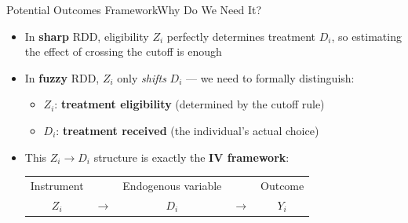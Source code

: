 \documentclass[hyperref={pdfpagelabels=false}]{beamer}
\begin{document}
\begin{frame}{Potential Outcomes Framework}{Why Do We Need It?}

\begin{itemize}
    \item In \textbf{sharp} RDD, eligibility $Z_i$ perfectly determines
          treatment $D_i$, so estimating the effect of crossing the cutoff
          is enough
    \vspace{0.3cm}
    \item In \textbf{fuzzy} RDD, $Z_i$ only \emph{shifts} $D_i$ ---
          we need to formally distinguish:
    \vspace{0.15cm}
    \begin{itemize}
        \item $Z_i$: \textbf{treatment eligibility}
              (determined by the cutoff rule)
        \vspace{0.1cm}
        \item $D_i$: \textbf{treatment received}
              (the individual's actual choice)
    \end{itemize}
    \vspace{0.3cm}
    \item This $Z_i \to D_i$ structure is exactly the
          \textbf{IV framework}:
    \vspace{0.15cm}
    \begin{center}
    \small
    \begin{tabular}{ccccc}
        Instrument & & Endogenous variable & & Outcome \\
        $Z_i$ & $\longrightarrow$ & $D_i$ & $\longrightarrow$ & $Y_i$
    \end{tabular}
    \end{center}
\end{itemize}
\end{frame}
\end{document}
